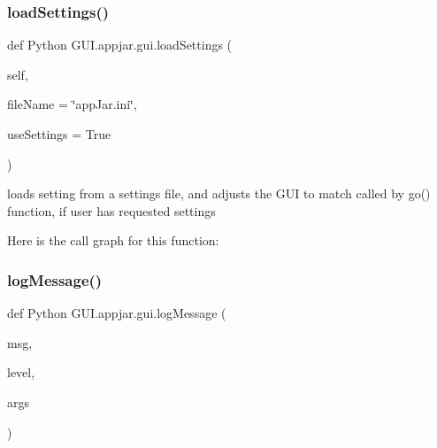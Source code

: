 \subsubsection{\texorpdfstring{load\+Settings()}{loadSettings()}}
{\footnotesize\ttfamily def Python G\+U\+I.\+appjar.\+gui.\+load\+Settings (\begin{DoxyParamCaption}\item[{}]{self,  }\item[{}]{file\+Name = {\ttfamily \char`\"{}appJar.ini\char`\"{}},  }\item[{}]{use\+Settings = {\ttfamily True} }\end{DoxyParamCaption})}

\begin{DoxyVerb}loads setting from a settings file, and adjusts the GUI to match
    called by go() function, if user has requested settings \end{DoxyVerb}
 Here is the call graph for this function\+:
\mbox{\label{class_python_01_g_u_i_1_1appjar_1_1gui_a80c2bac3103b9ebf3269cf9b66408b7f}} 
\subsubsection{\texorpdfstring{log\+Message()}{logMessage()}}
{\footnotesize\ttfamily def Python G\+U\+I.\+appjar.\+gui.\+log\+Message (\begin{DoxyParamCaption}\item[{}]{msg,  }\item[{}]{level,  }\item[{}]{args }\end{DoxyParamCaption})\hspace{0.3cm}{\ttfamily [static]}}


